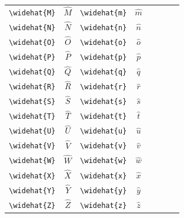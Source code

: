 \documentclass[12pt,a4paper]{article}
\begin{document}
\begin{longtable}{|l|c|l|c|c|l|c|c|}
\verb|\widehat{M}| & $\widehat{M}$   & \verb|\widehat{m}| & $\widehat{m}$   &                &                    &                 & \\
\verb|\widehat{N}| & $\widehat{N}$   & \verb|\widehat{n}| & $\widehat{n}$   &                &                    &                 & \\
\verb|\widehat{O}| & $\widehat{O}$   & \verb|\widehat{o}| & $\widehat{o}$   &                &                    &                 & \\
\verb|\widehat{P}| & $\widehat{P}$   & \verb|\widehat{p}| & $\widehat{p}$   &                &                    &                 & \\
\verb|\widehat{Q}| & $\widehat{Q}$   & \verb|\widehat{q}| & $\widehat{q}$   &                &                    &                 & \\
\verb|\widehat{R}| & $\widehat{R}$   & \verb|\widehat{r}| & $\widehat{r}$   &                &                    &                 & \\
\verb|\widehat{S}| & $\widehat{S}$   & \verb|\widehat{s}| & $\widehat{s}$   &                &                    &                 & \\
\verb|\widehat{T}| & $\widehat{T}$   & \verb|\widehat{t}| & $\widehat{t}$   &                &                    &                 & \\
\verb|\widehat{U}| & $\widehat{U}$   & \verb|\widehat{u}| & $\widehat{u}$   &                &                    &                 & \\
\verb|\widehat{V}| & $\widehat{V}$   & \verb|\widehat{v}| & $\widehat{v}$   &                &                    &                 & \\
\verb|\widehat{W}| & $\widehat{W}$   & \verb|\widehat{w}| & $\widehat{w}$   &                &                    &                 & \\
\verb|\widehat{X}| & $\widehat{X}$   & \verb|\widehat{x}| & $\widehat{x}$   &                &                    &                 & \\
\verb|\widehat{Y}| & $\widehat{Y}$   & \verb|\widehat{y}| & $\widehat{y}$   &                &                    &                 & \\
\verb|\widehat{Z}| & $\widehat{Z}$   & \verb|\widehat{z}| & $\widehat{z}$   &                &                    &                 & \\
\hline
\end{longtable}

\newpage
\end{document}
